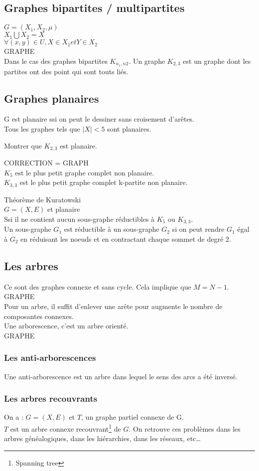 \subsection{Graphes bipartites / multipartites}
$G=(X_1,X_2,\mu)$\\$X_1\bigcup X_2=X$\\$\forall (x,y) \in U, X \in X_1 et Y \in X_2$\\
GRAPHE\\
Dans le cas des graphes bipartites $K_{n_1,n2}$. Un graphe $K_{2,3}$ est un graphe dont les partites ont des point qui sont touts liés.

\subsection{Graphes planaires}
G est planaire ssi on peut le dessiner sans croisement d'arêtes.\\
Tous les graphes tels que $|X|<5$ sont planaires.\\
\begin{exo}
 Montrer que $K_{2,3}$ est planaire.
\end{exo}
CORRECTION = GRAPH\\
$K_5$ est le plus petit graphe complet non planaire.\\
$K_{3,3}$ est le plus petit graphe complet k-partite non planaire.
\begin{theo}
 Théorème de Kuratowski\\
 $G=(X,E)$ et planaire\\
 Ssi il ne contient aucun sous-graphe réductibles à $K_5$ ou $K_{3,3}$.\\
 Un sous-graphe $G_1$ est réductible à un sous-graphe $G_2$ si on peut rendre $G_1$ égal à $G_2$ en réduisant les noeuds et en contractant chaque sommet de degré 2.
\end{theo}
\subsection{Les arbres}
Ce sont des graphes connexe et sans cycle. Cela implique que $M=N-1$.\\
GRAPHE\\
Pour un arbre, il suffit d'enlever une arête pour augmente le nombre de composantes connexes.\\
Une arborescence, c'est un arbre orienté.\\
GRAPHE\\
\subsubsection{Les anti-arborescences}
Une anti-arborescence est un arbre dans lequel le sens des arcs a été inversé.

\subsubsection{Les arbres recouvrants}
On a : $G=(X,E)$ et $T$, un graphe partiel connexe de G.\\
$T$ est un arbre connexe recouvrant\footnote{Spanning tree} de $G$. On retrouve ces problèmes dans les arbres généalogiques, dans les hiérarchies, dans les réseaux, etc\ldots
